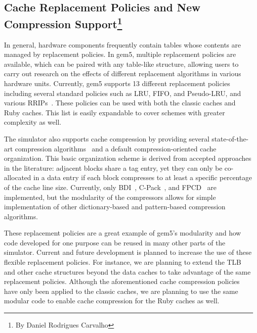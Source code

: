\subsection[Cache Replacement Policies and New Compression Support]{Cache Replacement Policies and New Compression Support\footnote{By Daniel Rodrigues Carvalho}}
\label{sec:replacement}

In general, hardware components frequently contain tables whose contents are managed by replacement policies.
In gem5, multiple replacement policies are available, which can be paired with any table-like structure, allowing users to carry out research on the effects of different replacement algorithms in various hardware units.
Currently, gem5 supports 13 different replacement policies including several standard policies such as LRU, FIFO, and Pseudo-LRU, and various RRIPs~\cite{Jaleel2010rrip}.
These policies can be used with both the classic caches and Ruby caches.
This list is easily expandable to cover schemes with greater complexity as well.

The simulator also supports cache compression by providing several state-of-the-art compression algorithms~\cite{sardashti2015primer} and a default compression-oriented cache organization.
This basic organization scheme is derived from accepted approaches in the literature: adjacent blocks share a tag entry, yet they can only be co-allocated in a data entry if each block compresses to at least a specific percentage of the cache line size.
Currently, only BDI~\cite{pekhimenko2012base}, C-Pack~\cite{chen2010c}, and FPCD~\cite{alameldeen2018opportunistic} are implemented, but the modularity of the compressors allows for simple implementation of other dictionary-based and pattern-based compression algorithms.

These replacement policies are a great example of gem5's modularity and how code developed for one purpose can be reused in many other parts of the simulator.
Current and future development is planned to increase the use of these flexible replacement policies.
For instance, we are planning to extend the TLB and other cache structures beyond the data caches to take advantage of the same replacement policies.
Although the aforementioned cache compression policies have only been applied to the classic caches, we are planning to use the same modular code to enable cache compression for the Ruby caches as well.

